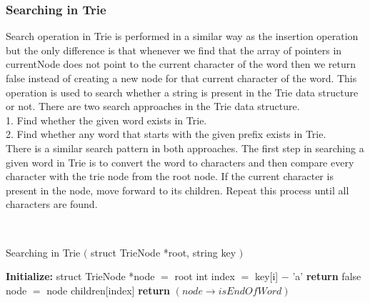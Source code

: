 \documentclass[11pt,a4paper]{article}
\begin{document}
\subsubsection{Searching in Trie}
\label{subsec:SearchingTrie}
Search operation in Trie is performed in a similar way as the insertion operation but the only difference is that whenever we find that the array of pointers in currentNode does not point to the current character of the word then we return false instead of creating a new node for that current character of the word. This operation is used to search whether a string is present in the Trie data structure or not. There are two search approaches in the Trie data structure.
\\
1. Find whether the given word exists in Trie.
\\
2. Find whether any word that starts with the given prefix exists in Trie.
\\
There is a similar search pattern in both approaches. The first step in searching a given word in Trie is to convert the word to characters and then compare every character with the trie node from the root node. If the current character is present in the node, move forward to its children. Repeat this process until all characters are found.

\\
\begin{algorithm}[H]
\caption*{Searching in Trie \begin{math} ( \end{math} struct TrieNode *root, string key \begin{math} ) \end{math}}
\label{DeletionTriepsuedocode}
\begin{algorithmic}
\STATE \textbf{Initialize:} struct TrieNode *node \begin{math} = \end{math} root
    \STATE int index \begin{math} = \end{math} key[i] \begin{math} - \end{math} 'a'
        \STATE \hspace{0.5cm} \textbf{return} false
    \ENDIF
    \STATE node \begin{math} = \end{math} node \to children[index]
\ENDFOR
\STATE \textbf{return} \begin{math} (node \to isEndOfWord) \end{math}
\end{algorithmic}
\end{algorithm}
\end{document}
